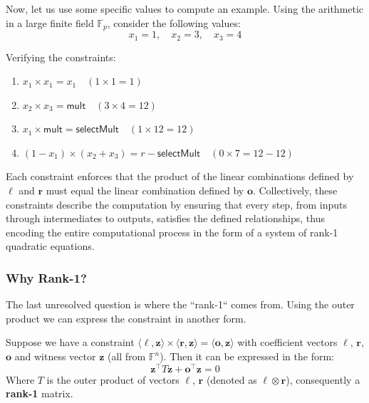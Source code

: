 \documentclass[../lecture-notes-148x210.tex]{subfiles}
\begin{document}
\begin{example}
    Now, let us use some specific values to compute an example. Using the arithmetic in a large finite
    field $\mathbb{F}_p$, consider the following values:
    \begin{equation*}
        x_1 = 1, \quad x_2 = 3, \quad x_3 = 4
    \end{equation*}

    Verifying the constraints:
    \begin{enumerate}
        \item \( x_1 \times x_1 = x_1 \quad (1 \times 1 = 1) \)
        \item \( x_2 \times x_3 = \mathsf{mult} \quad (3 \times 4 = 12) \)
        \item \( x_1 \times \mathsf{mult} = \mathsf{selectMult} \quad (1 \times 12 = 12) \)
        \item \( (1 - x_1) \times (x_2 + x_3) = r - \mathsf{selectMult} \quad (0 \times 7 = 12 - 12) \)
    \end{enumerate}
\end{example}

Each constraint enforces that the product of the linear combinations defined by $\boldsymbol{\ell}$ and $\boldsymbol{r}$ must
equal the linear combination defined by $\boldsymbol{o}$. Collectively, these constraints describe the 
computation by ensuring that every step, from inputs through intermediates to outputs, satisfies 
the defined relationships, thus encoding the entire computational process in the form of a system
of rank-1 quadratic equations.

\subsubsection{Why Rank-1?}
The last unresolved question is where the ``rank-1`` comes from. Using the outer
product we can express the constraint in another form.

\begin{lemma}
    Suppose we have a constraint $\langle \boldsymbol{\ell}, \mathbf{z}\rangle \times
    \langle \boldsymbol{r}, \mathbf{z}\rangle = \langle \boldsymbol{o}, \mathbf{z}
    \rangle$ with coefficient vectors $\boldsymbol{\ell}$, $\boldsymbol{r}$, $\boldsymbol{o}$
    and witness vector $\mathbf{z}$ (all from $\mathbb{F}^n$). Then it can be
    expressed in the form:
    \[ \mathbf{z}^{\top} T \mathbf{z} + \boldsymbol{o}^{\top} \mathbf{z} = 0 \]
    Where $T$ is the outer product of vectors $\boldsymbol{\ell}$, $\boldsymbol{r}$
    (denoted as $\boldsymbol{\ell} \otimes \boldsymbol{r}$), consequently a \textbf{rank-1}
    matrix.
\end{lemma}
\end{document}
